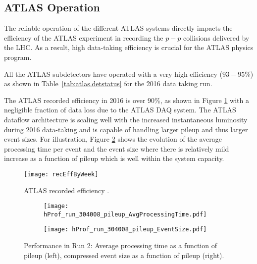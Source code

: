 \subsection{ATLAS Operation}

The reliable operation of the different ATLAS systems directly impacts the 
efficiency of the ATLAS experiment 
in recording the $p-p$ collisions delivered by the LHC. 
As a result, high data-taking efficiency is crucial 
for the ATLAS physics program. 

All the ATLAS subdetectors have operated with a very high efficiency 
($93-95\%$) as shown in Table~\ref{tab:atlas.detstatus} for the 2016 
data taking run.

The ATLAS recorded efficiency in 2016 is over 90\%, as shown in 
Figure \ref{fig:tdaq_diagram} with a negligible fraction of data loss due to 
the ATLAS DAQ system. 
The ATLAS dataflow architecture is scaling well with the increased 
instantaneous luminosity during 2016 data-taking and is capable of handling 
larger pileup and thus larger event sizes.
For illustration,  Figure \ref{fig:run_pileup} shows the evolution of the 
average processing time per event and 
the event size where there is relatively mild increase as a function of pileup 
which is well within the system capacity.

\begin{figure}[t!]
\vspace{-0.5cm}
\centering
\texttt{[image: recEffByWeek]} 
\vspace{-2.5cm}
\caption{ATLAS recorded efficiency \cite{atlasTwiki}.}
\label{fig:tdaq_diagram}
\end{figure} 


\begin{figure}[t!]
\centering
\begin{subfigure}[t]{0.48\textwidth}
\texttt{[image: hProf\_run\_304008\_pileup\_AvgProcessingTime.pdf]}
\end{subfigure}
\begin{subfigure}[t]{0.48\textwidth}
\texttt{[image: hProf\_run\_304008\_pileup\_EventSize.pdf]}
\end{subfigure}
\vspace{-0.3cm}
\caption{Performance in Run 2: Average processing time as a function of pileup (left), compressed event size as a function of pileup (right).}
\label{fig:run_pileup}
\end{figure} 



